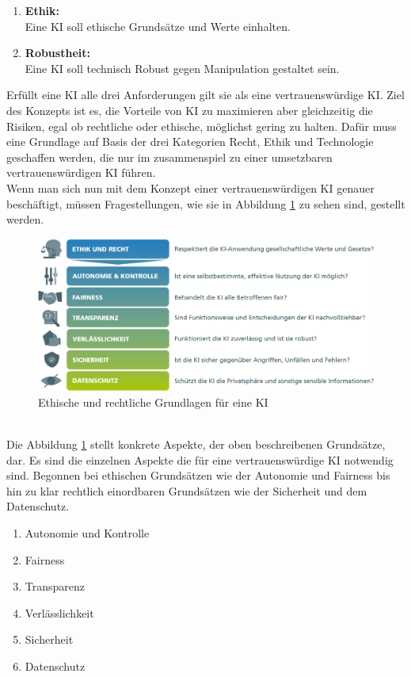 \begin{onehalfspace}
\begin{enumerate}
            \item \textbf{Ethik:} \\ Eine \ac*{KI} soll ethische Grundsätze und Werte einhalten.
            \item \textbf{Robustheit:} \\ Eine \ac*{KI} soll technisch Robust gegen Manipulation gestaltet sein.
        \end{enumerate}
        Erfüllt eine \ac*{KI} alle drei Anforderungen gilt sie als eine vertrauenswürdige \ac*{KI}. Ziel des Konzepts ist es, die Vorteile von \ac*{KI} zu maximieren aber gleichzeitig die Risiken, egal ob rechtliche oder ethische, möglichst gering zu halten.\cite{HEGKI2019} Dafür muss eine Grundlage auf Basis der drei Kategorien Recht, Ethik und Technologie geschaffen werden, die nur im zusammenspiel zu einer umsetzbaren vertrauenswürdigen \ac*{KI} führen.
        \\
        Wenn man sich nun mit dem Konzept einer vertrauenswürdigen \ac*{KI} genauer beschäftigt, müssen Fragestellungen, wie sie in Abbildung \ref*{fig:EthikAnforderungen} zu sehen sind, gestellt werden. 
        \\
        \begin{figure}[h]
            \centering
            \includegraphics[width = 14cm]{Bilder/Grafik-KI_Whitepaper_final_WEB_2.png}
            \caption{Ethische und rechtliche Grundlagen für eine \ac*{KI} \cite{Cremers2019}}
            \label{fig:EthikAnforderungen}
        \end{figure}
        \\
        Die Abbildung \ref*{fig:EthikAnforderungen} stellt konkrete Aspekte, der oben beschreibenen Grundsätze, dar. Es sind die einzelnen Aspekte die für eine vertrauenswürdige \ac*{KI} notwendig sind. Begonnen bei ethischen Grundsätzen wie der Autonomie und Fairness bis hin zu klar rechtlich einordbaren Grundsätzen wie der Sicherheit und dem Datenschutz.\cite{Cremers2019}
        \begin{enumerate}
            \item Autonomie und Kontrolle
            \item Fairness \cite{hagendorff2021blind}
            \item Transparenz \cite{Hallensleben2020}
            \item Verlässlichkeit 
            \item Sicherheit
            \item Datenschutz
        \end{enumerate}
        

\end{onehalfspace}
